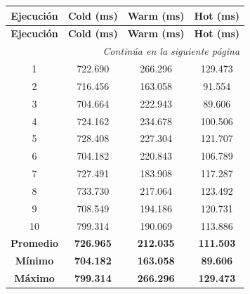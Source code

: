 \begin{longtable}{@{}cccc@{}}

\toprule
\textbf{Ejecución} &
\textbf{Cold (ms)} &
\textbf{Warm (ms)} &
\textbf{Hot (ms)} \\
\toprule
\endfirsthead

\toprule
\textbf{Ejecución} &
\textbf{Cold (ms)} &
\textbf{Warm (ms)} &
\textbf{Hot (ms)} \\
\toprule
\endhead

\midrule[\heavyrulewidth]
\multicolumn{4}{r}{\textit{Continúa en la siguiente página}}\\
\endfoot

\bottomrule
\endlastfoot

1  & 722.690 & 266.296 & 129.473 \\
2  & 716.456 & 163.058 & 91.554 \\
3  & 704.664 & 222.943 & 89.606 \\
4  & 724.162 & 234.678 & 100.506 \\
5  & 728.408 & 227.304 & 121.707 \\
6  & 704.182 & 220.843 & 106.789 \\
7  & 727.491 & 183.908 & 117.287 \\
8  & 733.730 & 217.064 & 123.492 \\
9  & 708.549 & 194.186 & 120.731 \\
10 & 799.314 & 190.069 & 113.886 \\

\midrule

\textbf{Promedio} & \textbf{726.965} & \textbf{212.035} & \textbf{111.503} \\
\textbf{Mínimo}   & \textbf{704.182} & \textbf{163.058} & \textbf{89.606} \\
\textbf{Máximo}   & \textbf{799.314} & \textbf{266.296} & \textbf{129.473} \\

\end{longtable}